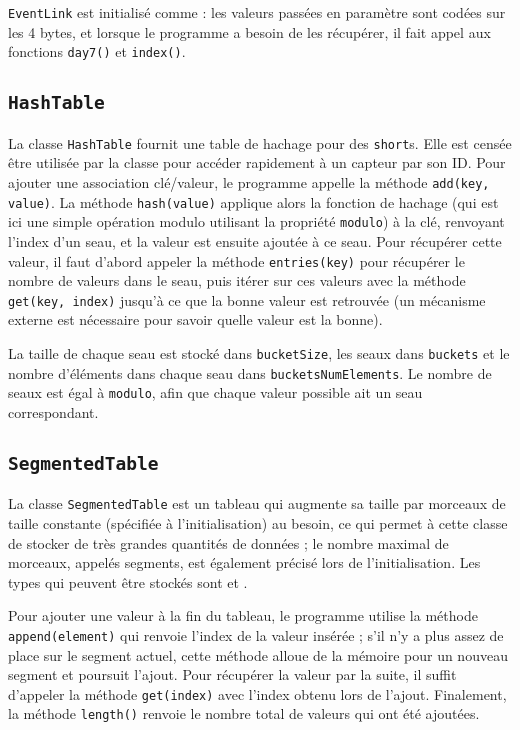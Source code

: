 \documentclass[11pt,a4paper]{article}
\begin{document}
\texttt{EventLink} est initialisé comme  : les valeurs passées en paramètre sont codées sur les 4 bytes, et lorsque le programme a besoin de les récupérer, il fait appel aux fonctions \texttt{day7()} et \texttt{index()}.

\subsection{\texttt{HashTable}}

La classe \texttt{HashTable} fournit une table de hachage pour des \texttt{short}s. Elle est censée être utilisée par la classe  pour accéder rapidement à un capteur par son ID. Pour ajouter une association clé/valeur, le programme appelle la méthode \texttt{add(key, value)}. La méthode \texttt{hash(value)} applique alors la fonction de hachage (qui est ici une simple opération modulo utilisant la propriété \texttt{modulo}) à la clé, renvoyant l'index d'un seau, et la valeur est ensuite ajoutée à ce seau. Pour récupérer cette valeur, il faut d'abord appeler la méthode \texttt{entries(key)} pour récupérer le nombre de valeurs dans le seau, puis itérer sur ces valeurs avec la méthode \texttt{get(key, index)} jusqu'à ce que la bonne valeur est retrouvée (un mécanisme externe est nécessaire pour savoir quelle valeur est la bonne).

La taille de chaque seau est stocké dans \texttt{bucketSize}, les seaux dans \texttt{buckets} et le nombre d'éléments dans chaque seau dans \texttt{bucketsNumElements}. Le nombre de seaux est égal à \texttt{modulo}, afin que chaque valeur possible ait un seau correspondant.

\subsection{\texttt{SegmentedTable}}
\label{subsec:SegmentedTable}

La classe \texttt{SegmentedTable} est un tableau qui augmente sa taille par morceaux de taille constante (spécifiée à l'initialisation) au besoin, ce qui permet à cette classe de stocker de très grandes quantités de données ; le nombre maximal de morceaux, appelés segments, est également précisé lors de l'initialisation. Les types qui peuvent être stockés sont  et .

Pour ajouter une valeur à la fin du tableau, le programme utilise la méthode \texttt{append(element)} qui renvoie l'index de la valeur insérée ; s'il n'y a plus assez de place sur le segment actuel, cette méthode alloue de la mémoire pour un nouveau segment et poursuit l'ajout. Pour récupérer la valeur par la suite, il suffit d'appeler la méthode \texttt{get(index)} avec l'index obtenu lors de l'ajout. Finalement, la méthode \texttt{length()} renvoie le nombre total de valeurs qui ont été ajoutées.
\end{document}
